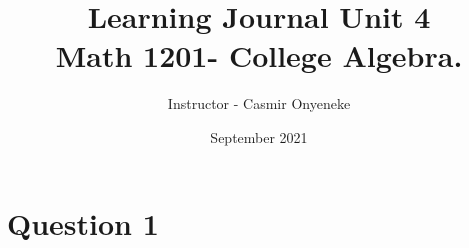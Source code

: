 \documentclass{article}
\title{Learning Journal Unit 4\\
Math 1201- College Algebra.
}
\author{Instructor - Casmir Onyeneke}
\date{September 2021}
\begin{document}
\maketitle

\section*{Question 1}
\end{document}
